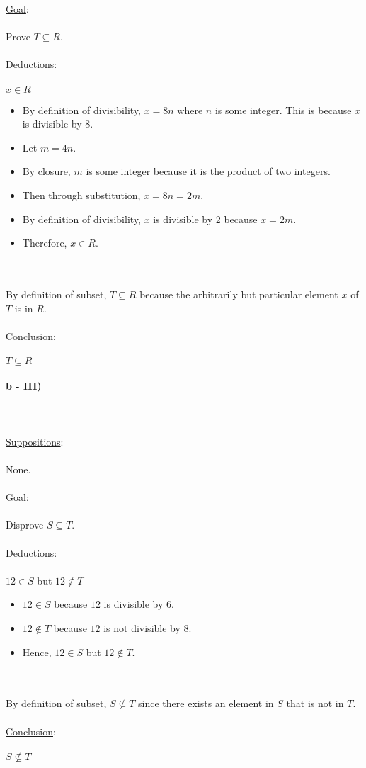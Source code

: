 \documentclass[12pt]{article}
\newcommand{\xlist}[1]{
    \begin{itemize}
        \renewcommand{\labelitemi}{$\centerdot$}
        #1
    \end{itemize}
    \newblock
    \\ \\
}
\newcommand{\xsupposition}[1]{
    \underline{Suppositions}:
    \\ \\
    #1
    \\ \\
}
\newcommand{\xgoal}[1]{
    \underline{Goal}:
    \\ \\
    #1
    \\ \\
}
\newcommand{\xdeductions}{
    \underline{Deductions}:
    \\ \\
}
\newcommand{\xconclusion}[1]{
    \underline{Conclusion}:
    \\ \\
    #1
    \\ \\
}
\begin{document}
\xgoal{Prove $T \subseteq R$.}
\xdeductions
$x \in R$
\xlist{
  \item By definition of divisibility, $x = 8n$ where $n$ is some integer. This is because $x$ is divisible by 8.
  \item Let $m = 4n$.
  \item By closure, $m$ is some integer because it is the product of two integers.
  \item Then through substitution, $x = 8n = 2m$.
  \item By definition of divisibility, $x$ is divisible by 2 because $x = 2m$.
  \item Therefore, $x \in R$.
}
By definition of subset, $T \subseteq R$ because the arbitrarily but particular element $x$ of $T$ is in $R$. 
\\ \\
\xconclusion{$T \subseteq R$}
\textbf{b - III)} \\ \\
\\ \\
\xsupposition{None.}
\xgoal{Disprove $S \subseteq T$.}
\xdeductions
$12 \in S$ but $12 \not\in T$
\xlist{
  \item $12 \in S$ because $12$ is divisible by 6.
  \item $12 \not\in T$ because $12$ is not divisible by 8.
  \item Hence, $12 \in S$ but $12 \not\in T$.
}
By definition of subset, $S \not\subseteq T$ since there exists an element in $S$ that is not in $T$.
\\ \\
\xconclusion{$S \not\subseteq T$}
\\ \\
\end{document}
